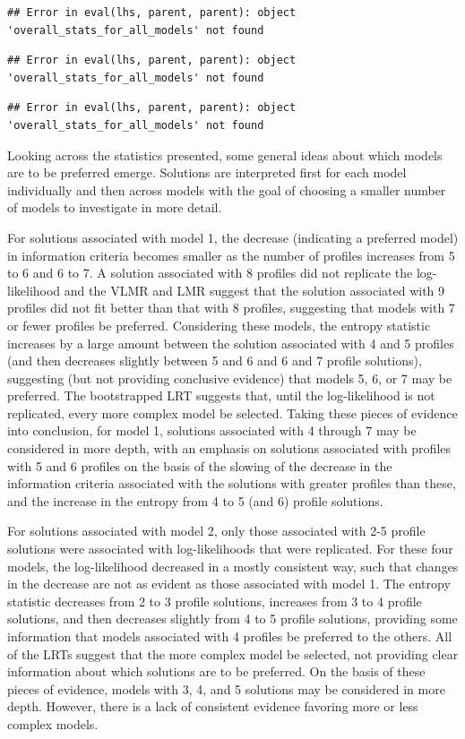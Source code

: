 \documentclass[]{msu-thesis}
\theoremstyle{definition}
\theoremstyle{definition}
\theoremstyle{definition}
\theoremstyle{remark}
\begin{document}
\begin{verbatim}
## Error in eval(lhs, parent, parent): object 'overall_stats_for_all_models' not found
\end{verbatim}

\begin{verbatim}
## Error in eval(lhs, parent, parent): object 'overall_stats_for_all_models' not found
\end{verbatim}

\begin{verbatim}
## Error in eval(lhs, parent, parent): object 'overall_stats_for_all_models' not found
\end{verbatim}

Looking across the statistics presented, some general ideas about which
models are to be preferred emerge. Solutions are interpreted first for
each model individually and then across models with the goal of choosing
a smaller number of models to investigate in more detail.

For solutions associated with model 1, the decrease (indicating a
preferred model) in information criteria becomes smaller as the number
of profiles increases from 5 to 6 and 6 to 7. A solution associated with
8 profiles did not replicate the log-likelihood and the VLMR and LMR
suggest that the solution associated with 9 profiles did not fit better
than that with 8 profiles, suggesting that models with 7 or fewer
profiles be preferred. Considering these models, the entropy statistic
increases by a large amount between the solution associated with 4 and 5
profiles (and then decreases slightly between 5 and 6 and 6 and 7
profile solutions), suggesting (but not providing conclusive evidence)
that models 5, 6, or 7 may be preferred. The bootstrapped LRT suggests
that, until the log-likelihood is not replicated, every more complex
model be selected. Taking these pieces of evidence into conclusion, for
model 1, solutions associated with 4 through 7 may be considered in more
depth, with an emphasis on solutions associated with profiles with 5 and
6 profiles on the basis of the slowing of the decrease in the
information criteria associated with the solutions with greater profiles
than these, and the increase in the entropy from 4 to 5 (and 6) profile
solutions.

For solutions associated with model 2, only those associated with 2-5
profile solutions were associated with log-likelihoods that were
replicated. For these four models, the log-likelihood decreased in a
mostly consistent way, such that changes in the decrease are not as
evident as those associated with model 1. The entropy statistic
decreases from 2 to 3 profile solutions, increases from 3 to 4 profile
solutions, and then decreases slightly from 4 to 5 profile solutions,
providing some information that models associated with 4 profiles be
preferred to the others. All of the LRTs suggest that the more complex
model be selected, not providing clear information about which solutions
are to be preferred. On the basis of these pieces of evidence, models
with 3, 4, and 5 solutions may be considered in more depth. However,
there is a lack of consistent evidence favoring more or less complex
models.
\end{document}
